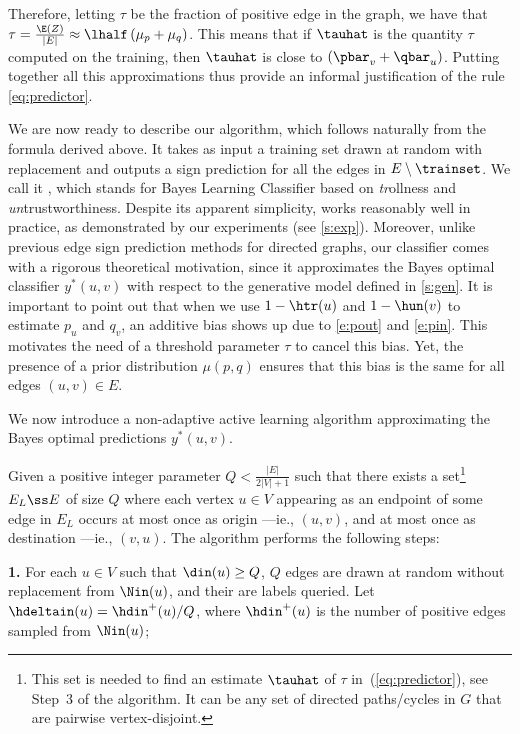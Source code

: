 Therefore, letting $\tau$ be the fraction of positive edge in the graph, we have that $\tau =
\frac{\E\left(Z \right)}{|E|} \approx \lhalf \left( \mu_p + \mu_q \right)$. This means that if
$\tauhat$ is the quantity $\tau$ computed on the training, then $\tauhat$ is close to $\left(
\pbar_v + \qbar_u \right)$. Putting together all this approximations thus provide an informal
justification of the rule \eqref{eq:predictor}.

We are now ready to describe our algorithm, which follows naturally from the formula derived above.
It takes as input a training set \trainset{} drawn at random with replacement and outputs a sign
prediction for all the edges in $E\setminus \trainset$. We call it \usrule{}, which stands for Bayes
Learning Classifier based on \emph{tr}ollness and \emph{un}trustworthiness.
\iffalse
Despite its apparent simplicity, \usrule{}
works reasonably well in practice, as demonstrated by our experiments (see \autoref{s:exp}).
Moreover, unlike previous edge sign prediction methods for directed graphs, our classifier comes
with a rigorous theoretical motivation, since it approximates the Bayes optimal classifier
$y^*(u,v)$ with respect to the generative model defined in \autoref{s:gen}. It is important to point
out that when we use $1-\htr(u)$ and $1-\hun(v)$ to estimate $p_u$ and $q_v$, an additive bias shows
up due to \eqref{e:pout} and \eqref{e:pin}. This motivates the need of a threshold parameter $\tau$
to cancel this bias. Yet, the presence of a prior distribution $\mu(p,q)$ ensures that this bias is
the same for all edges $(u,v) \in E$.


We now introduce a non-adaptive active learning algorithm approximating the Bayes optimal
predictions $y^*(u,v)$.

Given a positive integer parameter $Q < \tfrac{|E|}{2|V|+1}$ such that there exists a
set\footnote{This set is needed to find an estimate $\tauhat$ of $\tau$ in~(\ref{eq:predictor}), see
Step~3 of the algorithm. It can be any set of directed paths/cycles in $G$ that are pairwise
vertex-disjoint.} $E_L \ss E$ of size $Q$ where each vertex $u \in V$ appearing as an endpoint of
some edge in $E_L$ occurs at most once as origin ---ie{}., $(u,v)$, and at most once as destination
---ie{}., $(v,u)$. The algorithm performs the following steps:

\textbf{1.} For each $u \in V$ such that $\din(u) \ge Q$, $Q$ edges are drawn at random without
replacement from $\Nin(u)$, and their are labels queried. Let $\hdeltain(u) = \hdin^+(u)/Q$, where
$\hdin^+(u)$ is the number of positive edges sampled from $\Nin(u)$;

